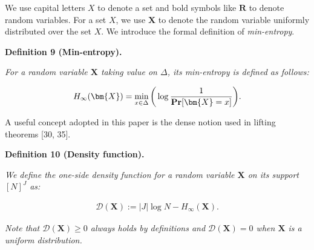 We use capital letters $X$ to denote a set and bold symbols like $\bm{R}$ to denote random variables. For a set $X$, we use $\bm{X}$ to denote the random variable uniformly distributed over the set $X$. We introduce the formal definition of \emph{min-entropy}.\par





\par\medskip\noindent\textbf{
\textbf{Definition 9}\textbf{ }(Min-entropy)\textbf{.}
}\par



\emph{For a random variable $\bm{X}$ taking value on $\Delta$, its min-entropy is defined as follows:}\par


\[\begin{gathered}
H_{\infty}(\bm{X})=\mathop{\min}_{x\in\Delta}\bigg{(}\log\frac{1}{\operatorname*{\mathbf{Pr}}[\bm{X}=x]}\bigg{)}.
\end{gathered}\]






A useful concept adopted in this paper is the dense notion used in lifting theorems [30, 35].\par





\par\medskip\noindent\textbf{
\textbf{Definition 10}\textbf{ }(Density function)\textbf{.}
}\par



\emph{We define the one-side density function for a random variable $\bm{X}$ on its support $[N]^{J}$ as:}\par


\[\begin{gathered}
\mathcal{D}(\bm{X}):=|J|\log N-H_{\infty}(\bm{X}).
\end{gathered}\]


\emph{Note that $\mathcal{D}(\bm{X})\geq 0$ always holds by definitions and $\mathcal{D}(\bm{X})=0$ when $\bm{X}$ is a uniform distribution.}\par






